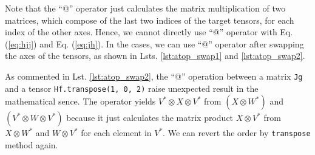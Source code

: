 \documentclass[a4paper]{article}
\begin{document}
\begin{center}
    
\end{center}

Note that the ``@'' operator just calculates the matrix multiplication of two matrices,
which compose of the last two indices of the target tensors, for each index of the other axes.
Hence, we cannot directly use ``@'' operator with Eq. (\ref{eq:hjj}) and Eq. (\ref{eq:jh}).
In the cases, we can use ``@'' operator after swapping the axes of the tensors,
as shown in Lsts. \ref{lst:atop_swap1} and \ref{lst:atop_swap2}.
\begin{center}
    
\end{center}
As commented in Lst. \ref{lst:atop_swap2},
the ``@'' operation between a matrix \texttt{Jg} and a tensor \texttt{Hf.transpose(1, 0, 2)} raise unexpected result
in the mathematical sence.
The operator yields $V^* \otimes X \otimes V^*$ from $(X\otimes W^*)$ and $(V^* \otimes W \otimes V^*)$
because it just calculates the matrix product $X \otimes V^*$ from
$X\otimes W^*$ and $W\otimes V^*$ for each element in $V^*$.
We can revert the order by \texttt{transpose} method again.
\begin{center}
    
\end{center}
\end{document}
